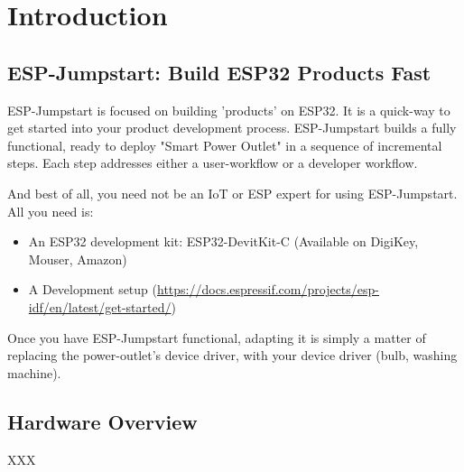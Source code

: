 \documentclass[11pt,fleqn]{book} %
\begin{document}

\pagestyle{fancy} %



\chapter{Introduction}

\section{ESP-Jumpstart: Build ESP32 Products Fast}

ESP-Jumpstart is focused on building 'products' on ESP32. It is a quick-way to get started into your product development process. ESP-Jumpstart builds a fully functional, ready to deploy "Smart Power Outlet" in a sequence of incremental steps. Each step addresses either a user-workflow or a developer workflow.

And best of all, you need not be an IoT or ESP expert for using ESP-Jumpstart. All you need is:

\begin{itemize}
\item An ESP32 development kit: ESP32-DevitKit-C (Available on DigiKey, Mouser, Amazon)
\item A Development setup (\url{https://docs.espressif.com/projects/esp-idf/en/latest/get-started/})
\end{itemize}

Once you have ESP-Jumpstart functional, adapting it is simply a matter of replacing the power-outlet's device driver, with your device driver (bulb, washing machine).

\section{Hardware Overview}
XXX




\end{document}
